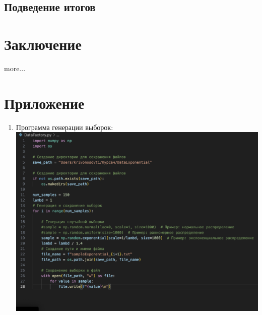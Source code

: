 \documentclass[specialist,
               substylefile = spbu_report.rtx,
               subf,href,colorlinks=true, 12pt]{disser}
\begin{document}
    \subsection{Подведение итогов}

\newpage
\section {Заключение}
more...
\newpage
\section {Приложение}
\begin{enumerate} 
    \item Программа генерации выборок:
    \newline
    \includegraphics[width = 6in]{image1.png}


\end{enumerate} 
        
\end{document}
